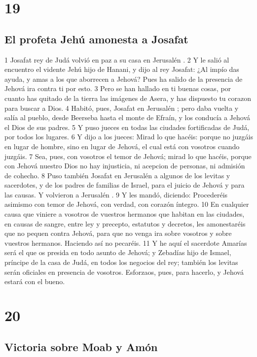 \chapter{19}

\section*{El profeta Jehú amonesta a Josafat}

1 Josafat rey de Judá volvió en paz a su casa en Jerusalén .
2 Y le salió al encuentro el vidente Jehú hijo de Hanani, y dijo al rey Josafat: ¿Al impío das ayuda, y amas a los que aborrecen a Jehová? Pues ha salido de la presencia de Jehová ira contra ti por esto.
3 Pero se han hallado en ti buenas cosas, por cuanto has quitado de la tierra las imágenes de Asera, y has dispuesto tu corazon para buscar a Dios.
4 Habitó, pues, Josafat en Jerusalén ; pero daba vuelta y salía al pueblo, desde Beerseba hasta el monte de Efraín, y los conducía a Jehová el Dios de sus padres.
5 Y puso jueces en todas las ciudades fortificadas de Judá, por todos los lugares.
6 Y dijo a los jueces: Mirad lo que hacéis: porque no juzgáis en lugar de hombre, sino en lugar de Jehová, el cual está con vosotros cuando juzgáis.
7 Sea, pues, con vosotros el temor de Jehová; mirad lo que hacéis, porque con Jehová nuestro Dios no hay injusticia, ni acepcion de personas, ni admisión de cohecho.
8 Puso también Josafat en Jerusalén a algunos de los levitas y sacerdotes, y de los padres de familias de Israel, para el juicio de Jehová y para las causas. Y volvieron a Jerusalén .
9 Y les mandó, diciendo: Procederéis asimismo con temor de Jehová, con verdad,  con corazón íntegro.
10 En cualquier causa que viniere a vosotros de vuestros hermanos que habitan en las ciudades, en causas de sangre, entre ley y precepto, estatutos y decretos, les amonestaréis que no pequen contra Jehová, para que no venga ira sobre vosotros y sobre vuestros hermanos. Haciendo así no pecaréis.
11 Y he aquí el sacerdote Amarías será el que os presida en todo asunto de Jehová; y Zebadías hijo de Ismael, príncipe de la casa de Judá, en todos los negocios del rey; también los levitas serán oficiales en presencia de vosotros. Esforzaos, pues, para hacerlo, y Jehová estará con el bueno.

\chapter{20}

\section*{Victoria sobre Moab y Amón}

